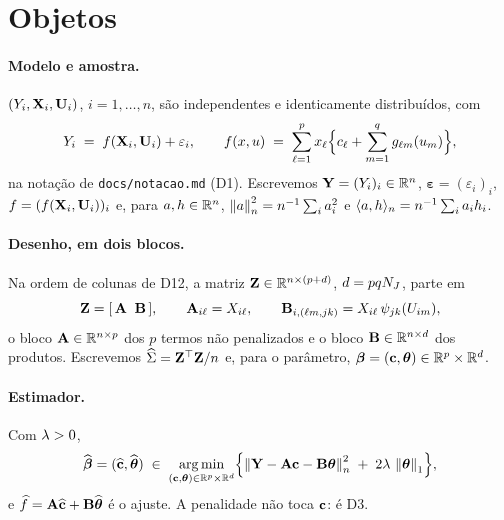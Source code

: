 \documentclass[11pt,a4paper]{article}
\newcommand{\Amat}{\mathbf{A}}
\newcommand{\Bmat}{\mathbf{B}}
\newcommand{\bbeta}{\boldsymbol{\beta}}
\newcommand{\betahat}{\widehat{\bbeta}}
\newcommand{\bveps}{\boldsymbol{\varepsilon}}
\newcommand{\bY}{\mathbf{Y}}
\begin{document}
\section{Objetos}

\paragraph{Modelo e amostra.} $(Y_{i}, \mathbf{X}_{i}, \mathbf{U}_{i})$, $i = 1, \dots, n$,
são independentes e identicamente distribuídos, com
\[
  Y_{i} \;=\; f(\mathbf{X}_{i}, \mathbf{U}_{i}) + \varepsilon_{i},
  \qquad
  f(x,u) \;=\; \sum_{\ell=1}^{p} x_{\ell}\Bigl\{c_{\ell} +
  \sum_{m=1}^{q}g_{\ell m}(u_{m})\Bigr\},
\]
na notação de \texttt{docs/notacao.md} (D1). Escrevemos
$\bY = (Y_{i})_{i} \in \R^{n}$, $\bveps = (\varepsilon_{i})_{i}$,
$f = (f(\mathbf{X}_{i},\mathbf{U}_{i}))_{i}$ e, para $a, h \in \mathbb{R}^{n}$,
$\left\lVert a \right\rVert_{n}^{2} = n^{-1}\sum_{i}a_{i}^{2}$ e
$\langle a, h \rangle_{n} = n^{-1}\sum_{i}a_{i}h_{i}$.

\paragraph{Desenho, em dois blocos.} Na ordem de colunas de D12, a matriz
$\mathbf{Z} \in \mathbb{R}^{n \times (p+d)}$, $d = pqN_{J}$, parte em
\[
  \bZ = [\,\Amat \;\; \Bmat\,], \qquad
  \Amat_{i\cv} = X_{i\cv}, \qquad
  \Bmat_{i,(\cv\md,\lev\tsl)} = X_{i\cv}\,\wav{\lev}{\tsl}(U_{i\md}),
\]
o bloco $\Amat \in \R^{n\times p}$ dos $p$ termos não penalizados e o bloco
$\Bmat \in \R^{n \times d}$ dos produtos. Escrevemos
$\widehat{\Sigma} = \mathbf{Z}^{\top}\mathbf{Z}/n$ e, para o parâmetro,
$\bbeta = (\bc, \btheta) \in \R^{p} \times \R^{d}$.

\paragraph{Estimador.} Com $\lambda > 0$,
\begin{equation}
  \label{eq:estimador}
  \betahat = (\chat, \thetahat)
  \;\in\; \operatorname*{arg\,min}_{(\bc,\btheta) \in \R^{p}\times\R^{d}}
  \Bigl\{ \normn{\bY - \Amat\bc - \Bmat\btheta}^{2}
  \;+\; 2\pen\,\norm{\btheta}_{1} \Bigr\},
\end{equation}
e $\widehat{f} = \Amat\chat + \Bmat\thetahat$ é o ajuste. A penalidade não
toca $\mathbf{c}$: é D3.
\end{document}

